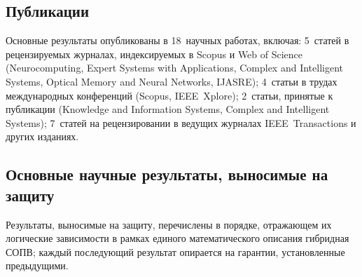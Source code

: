 \documentclass[12pt,a5paper]{article}
\begin{document}
\subsection*{Публикации}

Основные результаты опубликованы в 18~научных работах, включая:
5~статей в рецензируемых журналах, индексируемых в Scopus и Web
of Science (Neurocomputing, Expert Systems with Applications,
Complex and Intelligent Systems, Optical Memory and Neural
Networks, IJASRE); 4~статьи в трудах международных конференций
(Scopus, IEEE~Xplore); 2~статьи, принятые к публикации
(Knowledge and Information Systems, Complex and Intelligent
Systems); 7~статей на рецензировании в ведущих журналах
IEEE~Transactions и других изданиях.

\subsection*{Основные научные результаты, выносимые на защиту}

Результаты, выносимые на защиту, перечислены в порядке,
отражающем их логические зависимости в рамках единого
математического описания гибридная СОПВ; каждый последующий
результат опирается на гарантии, установленные предыдущими.
\end{document}
